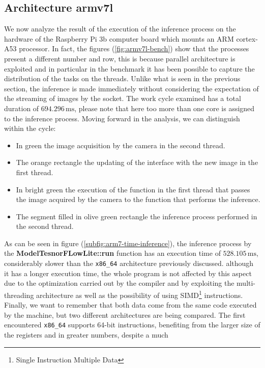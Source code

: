 \subsection{Architecture armv7l}
\label{ssec:armv7l-bench-inference}
%
We now analyze the result of the execution of the inference process on the
hardware of the Raspberry Pi 3b computer board which mounts an ARM cortex-A53
processor.
In fact, the figures (\ref{fig:armv7l-bench}) show that the processes present a
different number and row, this is because parallel architecture is exploited and
in particular in the benchmark it has been possible to capture the distribution
of the tasks on the threads.
Unlike what is seen in the previous section, the inference is made immediately without
considering the expectation of the streaming of images by the socket.
The work cycle examined has a total duration of $694.296 \,\si{\milli\second}$,
please note that here too more than one core is assigned to the inference
process.
Moving forward in the analysis, we can distinguish within the cycle:
\begin{itemize}
	\item In green the image acquisition by the camera in the second thread.
	\item The orange rectangle the updating of the interface with the new image in the first thread.
	\item In bright green the execution of the function in the first thread that passes the image acquired by the camera to the function that performs the inference.
	\item The segment filled in olive green rectangle the inference process performed in the second thread.
\end{itemize}
As can be seen in figure (\ref{subfig:arm7-time-inference}), the inference process by the
\textbf{ModelTesnorFLowLite::run} function has an execution time of $528.105 
\,\si{\milli\second}$, considerably slower than the \texttt{x86\_64}
architecture previously discussed. although it has a longer execution time, the
whole program is not affected by this aspect due to the optimization carried out
by the compiler and by exploiting the multi-threading architecture as well as the
possibility of using SIMD\footnote{Single Instruction Multiple Data}
instructions.\\
Finally, we want to remember that both data come from the same code executed by
the machine, but two different architectures are being compared. 
The first encountered \texttt{x86\_64} supports 64-bit instructions, benefiting
from the larger size of the registers and in greater numbers, despite a much
